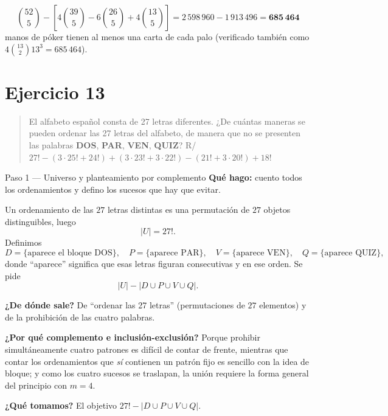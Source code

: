 \documentclass[11pt]{article}
\begin{document}
\begin{resp}
\[
\binom{52}{5} - \left[4\binom{39}{5} - 6\binom{26}{5} + 4\binom{13}{5}\right] = 2\,598\,960 - 1\,913\,496 = \mathbf{685\,464}
\]
manos de póker tienen al menos una carta de cada palo (verificado también como $4\binom{13}{2}13^{3} = 685\,464$).
\end{resp}

\section*{Ejercicio 13}

\begin{quote}
El alfabeto español consta de 27 letras diferentes. ¿De cuántas maneras se pueden ordenar las 27 letras del alfabeto, de manera que no se presenten las palabras \textbf{DOS}, \textbf{PAR}, \textbf{VEN}, \textbf{QUIZ}? \hfill R/ $27! - (3\cdot 25! + 24!) + (3\cdot 23! + 3\cdot 22!) - (21! + 3\cdot 20!) + 18!$
\end{quote}

\begin{paso}{Paso 1 --- Universo y planteamiento por complemento}
\textbf{Qué hago:} cuento todos los ordenamientos y defino los sucesos que hay que evitar.

Un ordenamiento de las $27$ letras distintas es una permutación de $27$ objetos distinguibles, luego
\[
|U| = 27! .
\]
Definimos
\[
D=\{\text{aparece el bloque DOS}\},\quad P=\{\text{aparece PAR}\},\quad V=\{\text{aparece VEN}\},\quad Q=\{\text{aparece QUIZ}\},
\]
donde ``aparece'' significa que esas letras figuran consecutivas y en ese orden. Se pide
\[
|U| - |D\cup P\cup V\cup Q| .
\]

\textbf{¿De dónde sale?} De ``ordenar las 27 letras'' (permutaciones de $27$ elementos) y de la prohibición de las cuatro palabras.

\textbf{¿Por qué complemento e inclusión-exclusión?} Porque prohibir simultáneamente cuatro patrones es difícil de contar de frente, mientras que contar los ordenamientos que \emph{sí} contienen un patrón fijo es sencillo con la idea de bloque; y como los cuatro sucesos se traslapan, la unión requiere la forma general del principio con $m=4$.

\textbf{¿Qué tomamos?} El objetivo $27!-|D\cup P\cup V\cup Q|$.
\end{paso}
\end{document}
